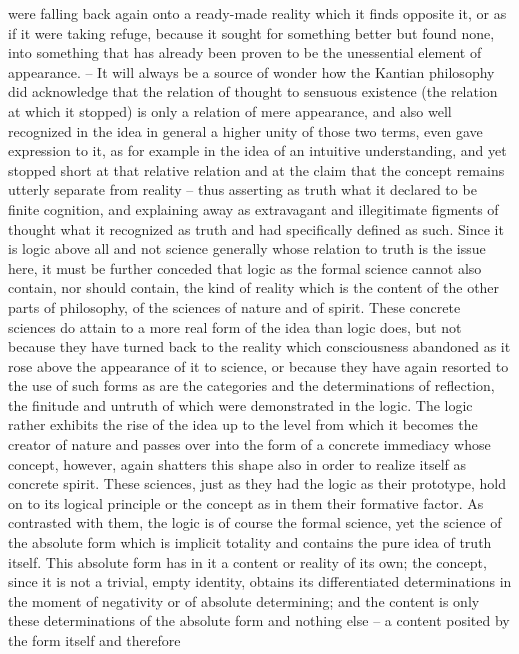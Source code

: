 were falling back again onto a ready-made reality which it finds opposite
it, or as if it were taking refuge, because it sought for something better
but found none, into something that has already been proven to be the
unessential element of appearance. – It will always be a source of wonder
how the Kantian philosophy did acknowledge that the relation of thought
to sensuous existence (the relation at which it stopped) is only a relation of
mere appearance, and also well recognized in the idea in general a higher
unity of those two terms, even gave expression to it, as for example in the
idea of an intuitive understanding, and yet stopped short at that relative
relation and at the claim that the concept remains utterly separate from
reality – thus asserting as truth what it declared to be finite cognition, and
explaining away as extravagant and illegitimate figments of thought what
it recognized as truth and had specifically defined as such.
Since it is logic above all and not science generally whose relation to
truth is the issue here, it must be further conceded that logic as the formal
science cannot also contain, nor should contain, the kind of reality which
is the content of the other parts of philosophy, of the sciences of nature
and of spirit. These concrete sciences do attain to a more real form of the
idea than logic does, but not because they have turned back to the reality
which consciousness abandoned as it rose above the appearance of it to
science, or because they have again resorted to the use of such forms as
are the categories and the determinations of reflection, the finitude and
untruth of which were demonstrated in the logic. The logic rather exhibits
the rise of the idea up to the level from which it becomes the creator
of nature and passes over into the form of a concrete immediacy whose
concept, however, again shatters this shape also in order to realize itself as
concrete spirit. These sciences, just as they had the logic as their prototype,
hold on to its logical principle or the concept as in them their formative
factor. As contrasted with them, the logic is of course the formal science,
yet the science of the absolute form which is implicit totality and contains
the pure idea of truth itself. This absolute form has in it a content or reality
of its own; the concept, since it is not a trivial, empty identity, obtains its
differentiated determinations in the moment of negativity or of absolute
determining; and the content is only these determinations of the absolute
form and nothing else – a content posited by the form itself and therefore
